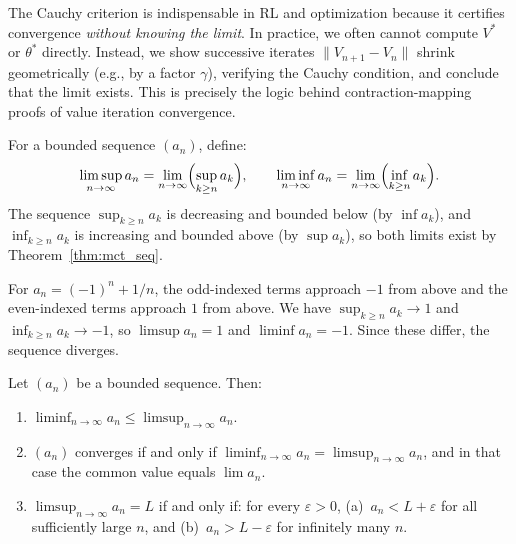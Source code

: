 \documentclass[11pt,a4paper]{article}
\begin{document}
\begin{rlconnection}[title={Cauchy sequences in iterative algorithms}]
The Cauchy criterion is indispensable in RL and optimization because it
certifies convergence \emph{without knowing the limit}. In practice, we
often cannot compute $V^*$ or $\theta^*$ directly. Instead, we show
successive iterates $\|V_{n+1} - V_n\|$ shrink geometrically (e.g., by a
factor $\gamma$), verifying the Cauchy condition, and conclude that the
limit exists. This is precisely the logic behind contraction-mapping
proofs of value iteration convergence.
\end{rlconnection}

\begin{definition}
\label{def:limsup_liminf}
For a bounded sequence $(a_n)$, define:
\[
  \limsup_{n \to \infty} a_n
  = \lim_{n \to \infty}\Bigl(\sup_{k \ge n} a_k\Bigr), \qquad
  \liminf_{n \to \infty} a_n
  = \lim_{n \to \infty}\Bigl(\inf_{k \ge n} a_k\Bigr).
\]
The sequence $\sup_{k \ge n} a_k$ is decreasing and bounded below
(by $\inf a_k$), and $\inf_{k \ge n} a_k$ is increasing and bounded
above (by $\sup a_k$), so both limits exist by
Theorem~\ref{thm:mct_seq}.
\end{definition}

\begin{example}
\label{ex:limsup_liminf}
For $a_n = (-1)^n + 1/n$, the odd-indexed terms approach $-1$ from above
and the even-indexed terms approach $1$ from above. We have
$\sup_{k \ge n} a_k \to 1$ and $\inf_{k \ge n} a_k \to -1$, so
$\limsup a_n = 1$ and $\liminf a_n = -1$. Since these differ, the
sequence diverges.
\end{example}

\begin{proposition}
\label{prop:limsup_props}
Let $(a_n)$ be a bounded sequence. Then:
\begin{enumerate}[nosep,label=(\roman*)]
  \item $\liminf_{n\to\infty} a_n \le \limsup_{n\to\infty} a_n$.
  \item $(a_n)$ converges if and only if
    $\liminf_{n\to\infty} a_n = \limsup_{n\to\infty} a_n$, and in that
    case the common value equals $\lim a_n$.
  \item $\limsup_{n\to\infty} a_n = L$ if and only if: for every
    $\varepsilon > 0$, (a)~$a_n < L + \varepsilon$ for all sufficiently
    large $n$, and (b)~$a_n > L - \varepsilon$ for infinitely many $n$.
\end{enumerate}
\end{proposition}
\end{document}
